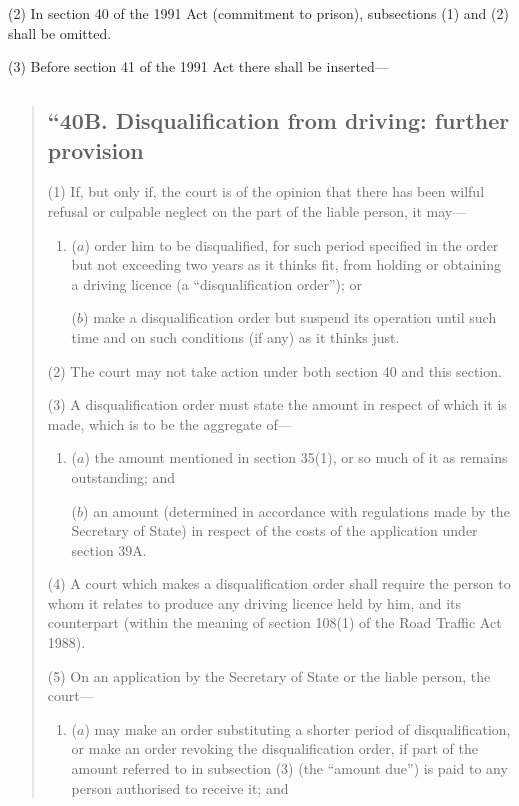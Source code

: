 \documentclass[12pt,a4paper]{article}
\begin{document}
(2) In section 40 of the 1991 Act (commitment to prison), subsections (1)  and (2)  shall be omitted.

(3) Before section 41 of the 1991 Act there shall be inserted—
\begin{quotation}
\subsection*{“40B. Disqualification from driving: further provision}
 
(1) If, but only if, the court is of the opinion that there has been wilful refusal or culpable neglect on the part of the liable person, it may—
\begin{enumerate}\item[]
($a$) order him to be disqualified, for such period specified in the order but not exceeding two years as it thinks fit, from holding or obtaining a driving licence (a “disqualification order”); or

($b$) make a disqualification order but suspend its operation until such time and on such conditions (if any) as it thinks just.
\end{enumerate}

(2) The court may not take action under both section 40 and this section.

(3) A disqualification order must state the amount in respect of which it is made, which is to be the aggregate of—
\begin{enumerate}\item[]
($a$) the amount mentioned in section 35(1), or so much of it as remains outstanding; and

($b$) an amount (determined in accordance with regulations made by the Secretary of State) in respect of the costs of the application under section 39A.
\end{enumerate}

(4) A court which makes a disqualification order shall require the person to whom it relates to produce any driving licence held by him, and its counterpart (within the meaning of section 108(1)  of the Road Traffic Act 1988).

(5) On an application by the Secretary of State or the liable person, the court—
\begin{enumerate}\item[]
($a$) may make an order substituting a shorter period of disqualification, or make an order revoking the disqualification order, if part of the amount referred to in subsection (3)  (the “amount due”) is paid to any person authorised to receive it; and


\end{enumerate}
\end{quotation}
\end{document}
